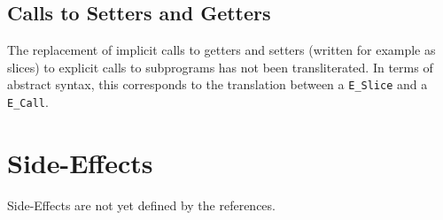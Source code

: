 \documentclass{book}
\begin{document}







\subsection{Calls to Setters and Getters}
The replacement of implicit calls to getters and setters (written for example as
slices) to explicit calls to subprograms has not been transliterated.
%
In terms of abstract syntax, this corresponds to the translation between a
\texttt{E\_Slice} and a \texttt{E\_Call}.




\section{Side-Effects}

Side-Effects are not yet defined by the references.


\end{document}
